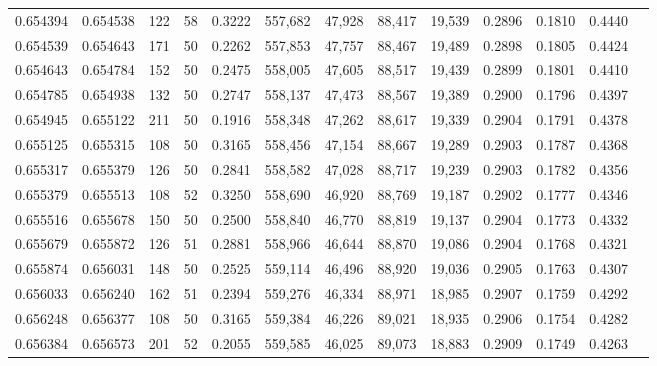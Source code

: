 \begin{tabular}{rrrrrrrrrrrrr}
0.654394 & 0.654538 &   122 &  58 &                                     0.3222 & 557,682 &  47,928 &  88,417 &  19,539 & 0.2896 & 0.1810 & 0.4440 \\
0.654539 & 0.654643 &   171 &  50 &                                     0.2262 & 557,853 &  47,757 &  88,467 &  19,489 & 0.2898 & 0.1805 & 0.4424 \\
0.654643 & 0.654784 &   152 &  50 &                                     0.2475 & 558,005 &  47,605 &  88,517 &  19,439 & 0.2899 & 0.1801 & 0.4410 \\
0.654785 & 0.654938 &   132 &  50 &                                     0.2747 & 558,137 &  47,473 &  88,567 &  19,389 & 0.2900 & 0.1796 & 0.4397 \\
0.654945 & 0.655122 &   211 &  50 &                                     0.1916 & 558,348 &  47,262 &  88,617 &  19,339 & 0.2904 & 0.1791 & 0.4378 \\
0.655125 & 0.655315 &   108 &  50 &                                     0.3165 & 558,456 &  47,154 &  88,667 &  19,289 & 0.2903 & 0.1787 & 0.4368 \\
0.655317 & 0.655379 &   126 &  50 &                                     0.2841 & 558,582 &  47,028 &  88,717 &  19,239 & 0.2903 & 0.1782 & 0.4356 \\
0.655379 & 0.655513 &   108 &  52 &                                     0.3250 & 558,690 &  46,920 &  88,769 &  19,187 & 0.2902 & 0.1777 & 0.4346 \\
0.655516 & 0.655678 &   150 &  50 &                                     0.2500 & 558,840 &  46,770 &  88,819 &  19,137 & 0.2904 & 0.1773 & 0.4332 \\
0.655679 & 0.655872 &   126 &  51 &                                     0.2881 & 558,966 &  46,644 &  88,870 &  19,086 & 0.2904 & 0.1768 & 0.4321 \\
0.655874 & 0.656031 &   148 &  50 &                                     0.2525 & 559,114 &  46,496 &  88,920 &  19,036 & 0.2905 & 0.1763 & 0.4307 \\
0.656033 & 0.656240 &   162 &  51 &                                     0.2394 & 559,276 &  46,334 &  88,971 &  18,985 & 0.2907 & 0.1759 & 0.4292 \\
0.656248 & 0.656377 &   108 &  50 &                                     0.3165 & 559,384 &  46,226 &  89,021 &  18,935 & 0.2906 & 0.1754 & 0.4282 \\
0.656384 & 0.656573 &   201 &  52 &                                     0.2055 & 559,585 &  46,025 &  89,073 &  18,883 & 0.2909 & 0.1749 & 0.4263 \\

\end{tabular}
